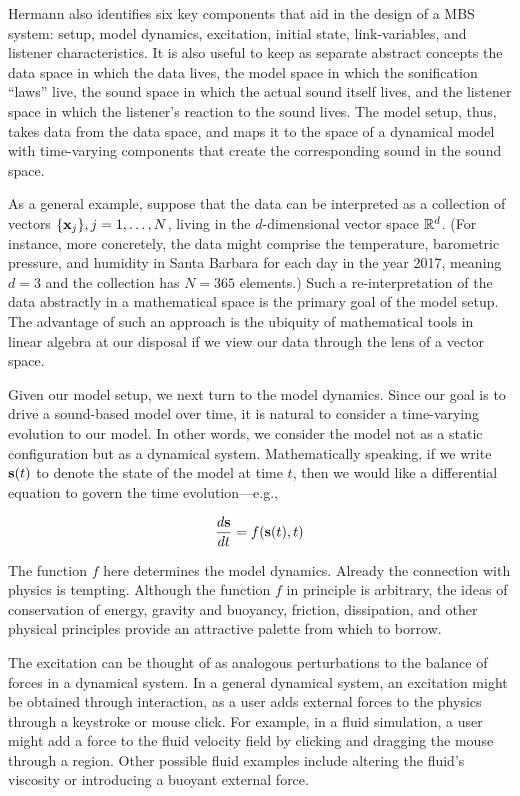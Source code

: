 Hermann also identifies six key components that aid in the design of a MBS 
system: setup, model dynamics, excitation, initial state, link-variables, and 
listener characteristics. It is also useful to keep as separate abstract 
concepts the data space in which the data lives, the model space in which 
the sonification ``laws'' live, the sound space in which the actual sound 
itself lives, and the listener space in which the listener's reaction to the 
sound lives. The model setup, thus, takes data from the data space, and maps 
it to the space of a dynamical model with time-varying components that create 
the corresponding sound in the sound space. 

As a general example, suppose that the data can be interpreted as a 
collection of vectors $\{\mathbf{x}_j\}, j=1,\dots,N$, living in the $d$-dimensional 
vector space $\mathbb{R}^d$. (For instance, more concretely, the data might comprise 
the temperature, barometric pressure, and humidity in Santa Barbara for each 
day in the year 2017, meaning $d=3$ and the collection has $N=365$ elements.) 
Such a re-interpretation of the data abstractly in a mathematical space is 
the primary goal of the model setup. The advantage of such an approach is the 
ubiquity of mathematical tools in linear algebra at our disposal if we view our data through the lens of a vector space.

Given our model setup, we next turn to the model dynamics. Since our goal is 
to drive a sound-based model over time, it is natural to consider a time-varying evolution to our model. In other words, we consider the model not as 
a static configuration but as a dynamical system. Mathematically speaking, if 
we write ${\mathbf{s}}(t)$ to denote the state of the model at time $t$, then we 
would like a differential equation to govern the time evolution---e.g.,

\begin{equation}
\frac{d{\mathbf{s}}}{dt} = f({\mathbf{s}}(t), t)
\end{equation}

The function $f$ here determines the model dynamics. Already the connection 
with physics is tempting. Although the function $f$ in principle is 
arbitrary, the ideas of conservation of energy, gravity and buoyancy, 
friction, dissipation, and other physical principles provide an attractive 
palette from which to borrow. 

The excitation can be thought of as analogous perturbations to the balance of 
forces in a dynamical system. In a general dynamical system, an excitation 
might be obtained through interaction, as a user adds external forces to the 
physics through a keystroke or mouse click. For example, in a fluid 
simulation, a user might add a force to the fluid velocity field by clicking 
and dragging the mouse through a region. Other possible fluid examples 
include altering the fluid's viscosity or introducing a buoyant external 
force. 

